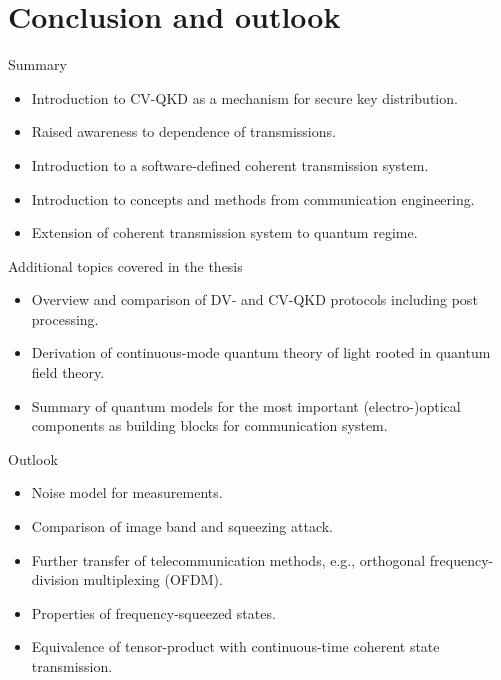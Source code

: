\documentclass[aspectratio=169,usenames,dvipsnames]{beamer}
\begin{document}
	\section{Conclusion and outlook}
	
	\begin{frame}{Summary}
		\begin{itemize}
			\item Introduction to CV-QKD as a mechanism for secure key distribution.
			\item Raised awareness to dependence of transmissions.
			\item Introduction to a software-defined coherent transmission system.
			\item Introduction to concepts and methods from communication engineering.
			\item Extension of coherent transmission system to quantum regime.
		\end{itemize}
	\end{frame}
	
	\begin{frame}{Additional topics covered in the thesis}
		\begin{itemize}
			\item Overview and comparison of DV- and CV-QKD protocols including post processing.
			\item Derivation of continuous-mode quantum theory of light rooted in quantum field theory.
			\item Summary of quantum models for the most important (electro-)optical components as building blocks for communication system.
		\end{itemize}		
	\end{frame}
	
	\begin{frame}{Outlook}
		\begin{itemize}
			\item Noise model for measurements.
			\item Comparison of image band and squeezing attack.
			\item Further transfer of telecommunication methods, e.g., orthogonal frequency-division multiplexing (OFDM).
			\item Properties of frequency-squeezed states.
			\item Equivalence of tensor-product with continuous-time coherent state transmission.
		\end{itemize}
	\end{frame}
\end{document}
